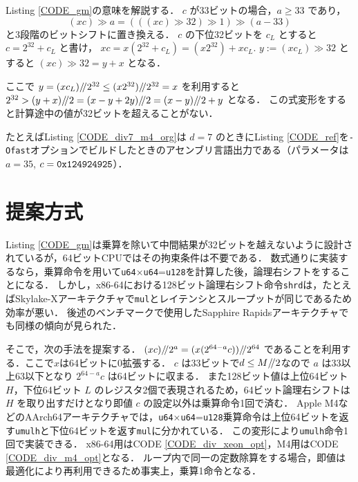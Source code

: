\documentclass{jarticle}
\begin{document}


Listing \ref{CODE_gm}の意味を解説する．
$c$ が33ビットの場合，$a \ge 33$ であり，
$$(x c)\gg a=(((x c) \gg 32) \gg 1) \gg (a-33)$$
と3段階のビットシフトに置き換える．
$c$ の下位32ビットを $c_L$ とすると $c=2^{32} + c_L$ と書け，
$x c = x (2^{32} + c_L) = (x 2^{32}) + x c_L$.
$y:=(x c_L)\gg 32$ とすると $(x c)\gg 32 = y+x$ となる．

ここで $y=(x c_L) {\mathbin{/\mkern-4mu/}} 2^{32}\le(x 2^{32}) {\mathbin{/\mkern-4mu/}} 2^{32} = x$ を利用すると
$2^{32}>(y+x) {\mathbin{/\mkern-4mu/}} 2=(x-y+2 y) {\mathbin{/\mkern-4mu/}} 2=(x-y) {\mathbin{/\mkern-4mu/}} 2+y$ となる．
この式変形をすると計算途中の値が32ビットを超えることがない．

たとえばListing \ref{CODE_div7_m4_org}は $d=7$ のときにListing \ref{CODE_ref}を{\tt -Ofast}オプションでビルドしたときのアセンブリ言語出力である（パラメータは$a=35$,  $c={\tt 0x124924925}$）．



\section{提案方式}
Listing \ref{CODE_gm}は乗算を除いて中間結果が32ビットを越えないように設計されているが，64ビットCPUではその拘束条件は不要である．
数式通りに実装するなら，乗算命令を用いて{\tt u64}×{\tt u64}={\tt u128}を計算した後，論理右シフトをすることになる．
しかし，x86-64における128ビット論理右シフト命令{\tt shrd}は，たとえばSkylake-Xアーキテクチャで{\tt mul}とレイテンシとスループットが同じであるため効率が悪い\cite{anger}．
後述のベンチマークで使用したSapphire Rapidsアーキテクチャでも同様の傾向が見られた．


そこで，次の手法を提案する．
$(x c) {\mathbin{/\mkern-4mu/}} 2^a=(x (2^{64-a} c)) {\mathbin{/\mkern-4mu/}} 2^{64}$ であることを利用する．ここで$x$は64ビットに0拡張する．
$c$ は33ビットで$d \le M {\mathbin{/\mkern-4mu/}} 2$なので $a$ は33以上63以下となり $2^{64-a} c$ は64ビットに収まる．
また128ビット値は上位64ビット $H$，下位64ビット $L$ のレジスタ2個で表現されるため，64ビット論理右シフトは $H$ を取り出すだけとなり即値 $c$ の設定以外は乗算命令1回で済む．
Apple M4などのAArch64アーキテクチャでは，{\tt u64}×{\tt u64}={\tt u128}乗算命令は上位64ビットを返す{\tt umulh}と下位64ビットを返す{\tt mul}に分かれている．
この変形により{\tt umulh}命令1回で実装できる．
x86-64用はCODE \ref{CODE_div_xeon_opt}，M4用はCODE \ref{CODE_div_m4_opt}となる．
ループ内で同一の定数除算をする場合，即値は最適化により再利用できるため事実上，乗算1命令となる．
\end{document}
